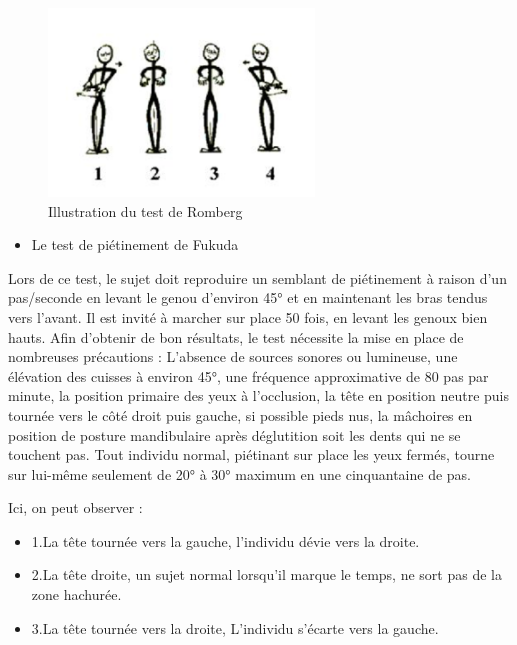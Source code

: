 \begin{figure}[H]
    \centering
    \includegraphics[height=5cm]{images/Exam_cli/Romberg.png}
    \caption{Illustration du test de Romberg}
    \label{fig:test_de_romberg}
\end{figure}


\begin{itemize}
    \item Le test de piétinement de Fukuda
\end{itemize}

Lors de ce test, le sujet doit reproduire un semblant de piétinement à raison d’un pas/seconde en levant le genou d’environ 45° et en maintenant les bras tendus vers l’avant. Il est invité à marcher sur place 50 fois, en levant les genoux bien hauts.
Afin d’obtenir de bon résultats, le test nécessite la mise en place de nombreuses précautions :  L'absence de sources sonores ou lumineuse, une élévation des cuisses à environ 45°, une fréquence approximative de 80 pas par minute, la position primaire des yeux à l'occlusion, la tête en position neutre puis tournée vers le côté droit puis gauche, si possible pieds nus, la mâchoires en position de posture mandibulaire après déglutition soit les dents qui ne se touchent pas.
Tout individu normal, piétinant sur place les yeux fermés, tourne sur lui-même seulement de 20° à 30° maximum en une cinquantaine de pas.

Ici, on peut observer :
\begin{itemize}
    \item 1.La tête tournée vers la gauche, l’individu dévie vers la droite.
    \item 2.La tête droite, un sujet normal lorsqu’il marque le temps, ne sort pas de la zone hachurée.
    \item 3.La tête tournée vers la droite, L’individu s’écarte vers la gauche.
\end{itemize}



